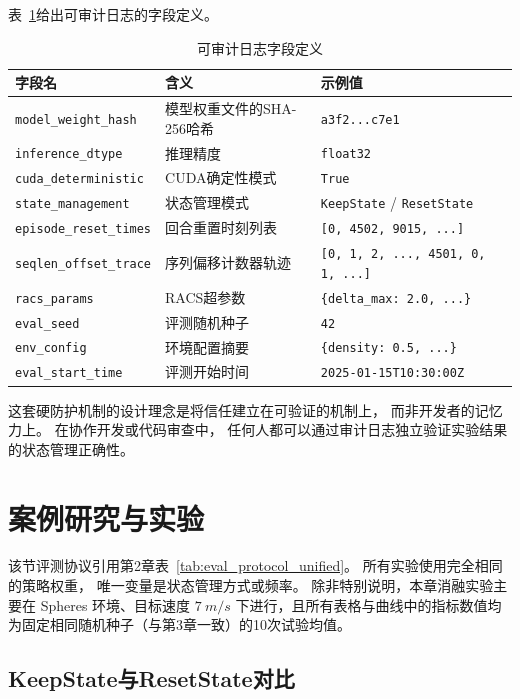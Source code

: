 表~\ref{tab:audit_log_fields}给出可审计日志的字段定义。

\begin{table}[htbp]
\centering
\caption{可审计日志字段定义}
\label{tab:audit_log_fields}
\begin{tabular}{p{3.5cm}p{4.0cm}p{5.0cm}}
\toprule
\textbf{字段名} & \textbf{含义} & \textbf{示例值} \\
\midrule
\texttt{model\_weight\_hash} & 模型权重文件的SHA-256哈希 & \texttt{a3f2...c7e1} \\
\texttt{inference\_dtype} & 推理精度 & \texttt{float32} \\
\texttt{cuda\_deterministic} & CUDA确定性模式 & \texttt{True} \\
\texttt{state\_management} & 状态管理模式 & \texttt{KeepState} / \texttt{ResetState} \\
\texttt{episode\_reset\_times} & 回合重置时刻列表 & \texttt{[0, 4502, 9015, ...]} \\
\texttt{seqlen\_offset\_trace} & 序列偏移计数器轨迹 & \texttt{[0, 1, 2, ..., 4501, 0, 1, ...]} \\
\texttt{racs\_params} & RACS超参数 & \texttt{\{delta\_max: 2.0, ...\}} \\
\texttt{eval\_seed} & 评测随机种子 & \texttt{42} \\
\texttt{env\_config} & 环境配置摘要 & \texttt{\{density: 0.5, ...\}} \\
\texttt{eval\_start\_time} & 评测开始时间 & \texttt{2025-01-15T10:30:00Z} \\
\bottomrule
\end{tabular}
\end{table}

这套硬防护机制的设计理念是将信任建立在可验证的机制上，
而非开发者的记忆力上。
在协作开发或代码审查中，
任何人都可以通过审计日志独立验证实验结果的状态管理正确性。


\section{案例研究与实验} \label{sec:ch4_exp}

该节评测协议引用第2章表~\ref{tab:eval_protocol_unified}。
所有实验使用完全相同的策略权重，
唯一变量是状态管理方式或频率。
除非特别说明，本章消融实验主要在 Spheres 环境、目标速度 $\SI{7}{m/s}$ 下进行，且所有表格与曲线中的指标数值均为固定相同随机种子（与第3章一致）的10次试验均值。

\subsection{KeepState与ResetState对比}

